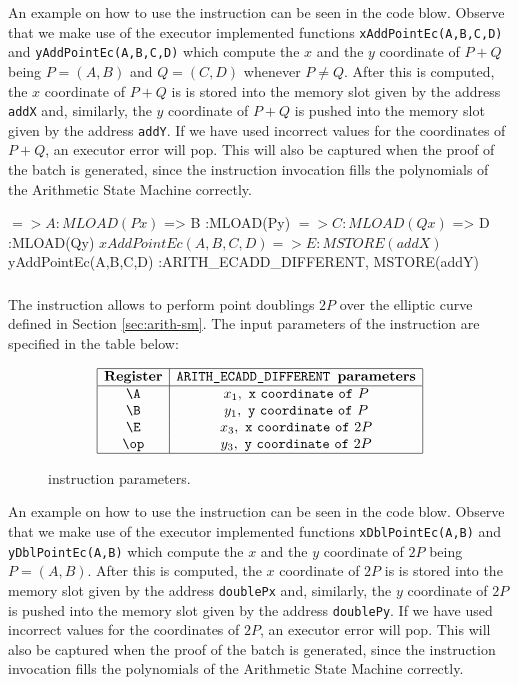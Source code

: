 An example on how to use the \ARITHADDDIFF instruction can be seen in the code blow. Observe that we make use of the executor implemented functions \texttt{xAddPointEc(A,B,C,D)} and \texttt{yAddPointEc(A,B,C,D)} which compute the $x$ and the $y$ coordinate of $P + Q$ being $P = (A, B)$ and $Q = (C, D)$ whenever $P \neq Q$. After this is computed, the $x$ coordinate of $P + Q$ is is stored into the memory slot given by the address \texttt{addX} and, similarly, the $y$ coordinate of $P + Q$ is pushed into the memory slot given by the address \texttt{addY}. If we have used incorrect values for the coordinates of $P + Q$, an executor error will pop. This will also be captured when the proof of the batch is generated, since the instruction invocation fills the polynomials of the Arithmetic State Machine correctly. 

\begin{zkasm}
$ => A  						:MLOAD(Px)
$ => B  						:MLOAD(Py)
$ => C  						:MLOAD(Qx)
$ => D  						:MLOAD(Qy)
${xAddPointEc(A,B,C,D)} => E  	:MSTORE(addX)
${yAddPointEc(A,B,C,D)} 		:ARITH_ECADD_DIFFERENT, MSTORE(addY)
\end{zkasm}


\subsubsection{\ARITHADDSAME}

The \ARITHADDSAME instruction allows to perform point doublings $2P$ over the elliptic curve defined in Section \ref{sec:arith-sm}. The input parameters of the instruction are specified in the table below:

\begin{figure}[h!]
\renewcommand{\figurename}{Table}
\[
\begin{array}{|c|c|}
\hline
\mathbf{Register} &\texttt{ARITH\_ECADD\_DIFFERENT } \textbf{parameters} \\ \hline
\A & x_1, \mathtt{~x~coordinate~of~}P \\
\B & y_1, \mathtt{~y~coordinate~of~}P \\
\E & x_3, \mathtt{~x~coordinate~of~}2P \\
\op & y_3, \mathtt{~y~coordinate~of~}2P \\
\hline
\end{array}
\]
\caption{\ARITHADDDIFF instruction parameters.}
\label{tab:memory-first-example}
\end{figure}

An example on how to use the \ARITHADDSAME instruction can be seen in the code blow. Observe that we make use of the executor implemented functions \texttt{xDblPointEc(A,B)} and \texttt{yDblPointEc(A,B)} which compute the $x$ and the $y$ coordinate of $2P$ being $P = (A, B)$. After this is computed, the $x$ coordinate of $2P$ is is stored into the memory slot given by the address \texttt{doublePx} and, similarly, the $y$ coordinate of $2P$ is pushed into the memory slot given by the address \texttt{doublePy}. If we have used incorrect values for the coordinates of $2P$, an executor error will pop. This will also be captured when the proof of the batch is generated, since the instruction invocation fills the polynomials of the Arithmetic State Machine correctly. 

